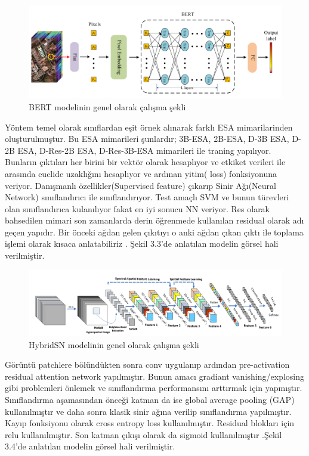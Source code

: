 \begin{figure}[!ht]
  \centering
  \includegraphics[width=1\textwidth]{Figures/bert14.png}
  \caption{BERT modelinin genel olarak çalışma şekli }
\end{figure}

\newpage
Yöntem temel olarak sınıflardan eşit örnek alınarak farklı ESA mimarilarinden oluşturulmuştur. Bu ESA mimarileri şunlardır; 3B-ESA, 2B-ESA,  D-3B ESA, D-2B ESA, D-Res-2B ESA, D-Res-3B-ESA mimarileri ile traning yapılıyor. Bunların çıktıları her birini bir vektör olarak hesaplıyor ve etkiket verileri ile arasında euclide uzaklığını hesaplıyor ve ardınan yitim( loss) fonksiyonuna veriyor. Danışmanlı özellikler(Supervised feature) çıkarıp Sinir Ağı(Neural Network) sınıflandırıcı ile sınıflandırıyor. Test amaçlı SVM ve bunun türevleri olan sınıflandırıca kulanılıyor fakat en iyi sonucu NN veriyor. Res olarak bahsedilen mimari son zamanlarda derin öğrenmede kullanılan residual olarak adı geçen yapıdır. Bir önceki ağdan gelen çıkıtıyı o anki ağdan çıkan çıktı ile toplama işlemi olarak kısaca anlatabiliriz \cite{roy2019hybridsn}. Şekil 3.3'de anlatılan modelin görsel hali verilmiştir. \\


\begin{figure}[!ht]
  \centering
  \includegraphics[width=1\textwidth]{Figures/hybrdidSN15.png}
  \caption{HybridSN modelinin genel olarak çalışma şekli }
\end{figure}

\newpage
Görüntü patchlere bölündükten sonra conv uygulanıp ardından pre-activation residual attention network yapılmıştır. Bunun amacı gradiant vanishing/explosing gibi problemleri önlemek ve sınıflandırma performansını arttırmak için yapmıştır. Sınıflandırma aşamasından önceği katman da ise global average pooling (GAP) kullanılmıştır ve daha sonra klasik sinir ağına verilip sınıflandırma yapılmıştır. Kayıp fonksiyonu olarak cross entropy loss kullanılmıştır. Residual blokları için relu kullanılmıştır. Son katman çıkışı olarak da sigmoid kullanılmıştır \cite{gao2019hyperspectral}.Şekil 3.4'de anlatılan modelin görsel hali verilmiştir. \\

